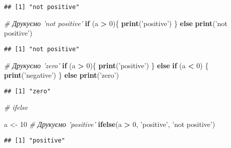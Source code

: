 \documentclass[
]{article}
\newenvironment{Shaded}{\begin{snugshade}}{\end{snugshade}}
\newcommand{\CommentTok}[1]{\textcolor[rgb]{0.56,0.35,0.01}{\textit{#1}}}
\newcommand{\ControlFlowTok}[1]{\textcolor[rgb]{0.13,0.29,0.53}{\textbf{#1}}}
\newcommand{\DecValTok}[1]{\textcolor[rgb]{0.00,0.00,0.81}{#1}}
\newcommand{\KeywordTok}[1]{\textcolor[rgb]{0.13,0.29,0.53}{\textbf{#1}}}
\newcommand{\NormalTok}[1]{#1}
\newcommand{\OperatorTok}[1]{\textcolor[rgb]{0.81,0.36,0.00}{\textbf{#1}}}
\newcommand{\StringTok}[1]{\textcolor[rgb]{0.31,0.60,0.02}{#1}}
\begin{document}
\begin{verbatim}
## [1] "not positive"
\end{verbatim}

\begin{Shaded}
\begin{Highlighting}[]
\CommentTok{# Друкуємо 'not positive'}
\ControlFlowTok{if}\NormalTok{ (a }\OperatorTok{>}\StringTok{ }\DecValTok{0}\NormalTok{)\{}
  \KeywordTok{print}\NormalTok{(}\StringTok{'positive'}\NormalTok{)}
\NormalTok{\} }\ControlFlowTok{else} \KeywordTok{print}\NormalTok{(}\StringTok{'not positive'}\NormalTok{)}
\end{Highlighting}
\end{Shaded}

\begin{verbatim}
## [1] "not positive"
\end{verbatim}

\begin{Shaded}
\begin{Highlighting}[]
\CommentTok{# Друкуємо 'zero'}
\ControlFlowTok{if}\NormalTok{ (a }\OperatorTok{>}\StringTok{ }\DecValTok{0}\NormalTok{)\{}
  \KeywordTok{print}\NormalTok{(}\StringTok{'positive'}\NormalTok{)}
\NormalTok{\} }\ControlFlowTok{else} \ControlFlowTok{if}\NormalTok{ (a }\OperatorTok{<}\StringTok{ }\DecValTok{0}\NormalTok{) \{}
  \KeywordTok{print}\NormalTok{(}\StringTok{'negative'}\NormalTok{)}
\NormalTok{\} }\ControlFlowTok{else} \KeywordTok{print}\NormalTok{(}\StringTok{'zero'}\NormalTok{)}
\end{Highlighting}
\end{Shaded}

\begin{verbatim}
## [1] "zero"
\end{verbatim}

\begin{Shaded}
\begin{Highlighting}[]
\CommentTok{# ifelse}

\NormalTok{a <-}\StringTok{ }\DecValTok{10}
\CommentTok{# Друкуємо 'positive'}
\KeywordTok{ifelse}\NormalTok{(a }\OperatorTok{>}\StringTok{ }\DecValTok{0}\NormalTok{, }\StringTok{'positive'}\NormalTok{, }\StringTok{'not positive'}\NormalTok{)}
\end{Highlighting}
\end{Shaded}

\begin{verbatim}
## [1] "positive"
\end{verbatim}
\end{document}
